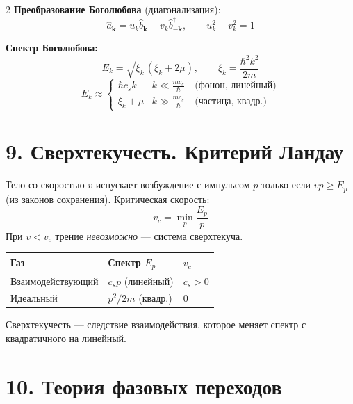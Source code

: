 \documentclass[a4paper,10pt]{article}
\begin{document}
\begin{multicols}{2}
\textbf{Преобразование Боголюбова} (диагонализация):
\begin{equation*}
    \hat{a}_\mathbf{k} = u_k\hat{b}_\mathbf{k} - v_k\hat{b}^\dagger_{-\mathbf{k}}, \qquad u_k^2 - v_k^2 = 1
\end{equation*}

\textbf{Спектр Боголюбова:}
\begin{equation*}
    \boxed{E_k = \sqrt{\xi_k\,(\xi_k + 2\mu)},\qquad \xi_k = \frac{\hbar^2k^2}{2m}}
\end{equation*}
\begin{equation*}
    E_k \approx \begin{cases} \hbar c_s k & k \ll \tfrac{mc_s}{\hbar} \quad\text{(фонон, линейный)} \\ \xi_k + \mu & k \gg \tfrac{mc_s}{\hbar} \quad\text{(частица, квадр.)} \end{cases}
\end{equation*}

\section*{9. Сверхтекучесть. Критерий Ландау}

Тело со скоростью $v$ испускает возбуждение с импульсом $p$ только если $vp \geq E_p$ (из законов сохранения). Критическая скорость:
\begin{equation*}
    v_c = \min_p\frac{E_p}{p}
\end{equation*}
При $v < v_c$ трение \emph{невозможно} --- система сверхтекуча.

\begin{center}
{\small
\renewcommand{\arraystretch}{1.15}
\begin{tabular}{@{}lll@{}}
\toprule
Газ & Спектр $E_p$ & $v_c$ \\
\midrule
Взаимодействующий & $c_s p$ (линейный) & $c_s > 0$ \\
Идеальный & $p^2/2m$ (квадр.) & $0$ \\
\bottomrule
\end{tabular}
}
\end{center}

Сверхтекучесть --- следствие взаимодействия, которое меняет спектр с квадратичного на линейный.

\section*{10. Теория фазовых переходов}


\end{multicols}
\end{document}
